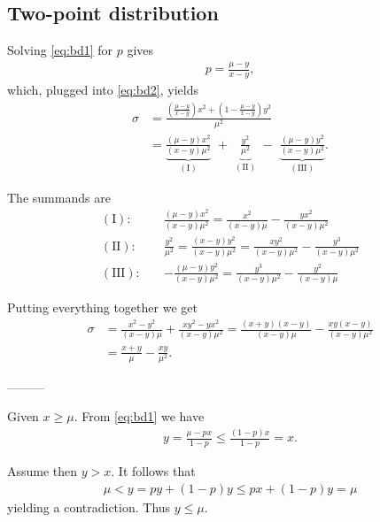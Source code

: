 \subsection{Two-point distribution}

Solving \eqref{eq:bd1} for $p$ gives
\begin{align}
  p = \frac{\mu-y}{x-y},
\end{align}
%
which, plugged into \eqref{eq:bd2}, yields
\begin{align}
  \sigma & = \frac{\left(\frac{\mu-y}{x-y}\right)x^2  + \left(1-\frac{\mu-y}{x-y}\right) y^2}{\mu^2} \\ & = \underbrace{\frac{(\mu - y)x^2}{(x-y)\mu^2}}_{\mathrm{(I)}}\,\, + \,\, \underbrace{\frac{y^2}{\mu^2}}_{\mathrm{(II)}}\,\, - \,\, \underbrace{\frac{(\mu - y)y^2}{(x-y) \mu^2}}_{\mathrm{(III)}}.
\end{align}

The summands are
\begin{align}
  \mathrm{(I):} \quad & \frac{(\mu - y)x^2}{(x-y)\mu^2} = \frac{x^2}{(x-y)\mu} - \frac{yx^2}{(x-y)\mu^2} \\
  \mathrm{(II):} \quad &  \frac{y^2}{\mu^2} = \frac{(x-y)y^2}{(x-y)\mu^2} = \frac{xy^2}{(x-y)\mu^2} - \frac{y^3}{(x-y)\mu^2} \\
  \mathrm{(III):} \quad & - \frac{(\mu - y)y^2}{(x-y) \mu^2} = \frac{y^3}{(x-y)\mu^2} - \frac{y^2}{(x-y)\mu}
\end{align}

Putting everything together we get
\begin{align}
  \sigma & =  \frac{x^2 - y^2}{(x-y)\mu} + \frac{xy^2 -yx^2}{(x-y)\mu^2}  = \frac{(x + y) (x-y)}{(x-y)\mu} - \frac{xy (x-y)}{(x-y)\mu^2} \\
  & = \frac{x+y}{\mu} - \frac{xy}{\mu^2}.
\end{align}

---------

Given $x \geq \mu$. From \eqref{eq:bd1} we have
\begin{align}
  y = \frac{\mu - px}{1-p} \leq \frac{(1-p)x}{1-p} = x.
\end{align}

Assume then $y > x$. It follows that
\begin{align}
  \mu < y = py + (1-p)y \leq px + (1-p)y = \mu
\end{align}
yielding a contradiction. Thus $y \leq \mu$.



